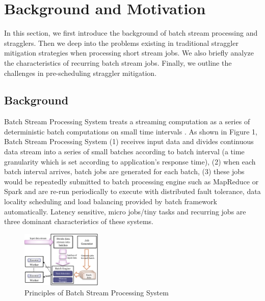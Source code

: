 \section{Background and Motivation}

  In this section, we first introduce the background of batch stream processing and stragglers. Then we deep into the problems existing in traditional straggler mitigation strategies when processing short stream jobs. We also briefly analyze the characteristics of recurring batch stream jobs. Finally, we outline the challenges in pre-scheduling straggler mitigation.

\subsection{Background}

  Batch Stream Processing System treats a streaming computation as a series of deterministic batch computations on small time intervals \cite{Zaharia2013}. As shown in Figure 1, Batch Stream Processing System (1) receives input data and divides continuous data stream into a series of small batches according to batch interval (a time granularity which is set according to application's response time), (2) when each batch interval arrives, batch jobs are generated for each batch, (3) these jobs would be repeatedly submitted to batch processing engine such as MapReduce or Spark and are re-run periodically to execute with distributed fault tolerance, data locality scheduling and load balancing provided by batch framework automatically. Latency sensitive, micro jobs/tiny tasks and recurring jobs are three dominant characteristics of these systems.
  \begin{figure}[htbp]
    \centering
    \includegraphics[width=0.34\textwidth]{FigureBatchStream}
    \caption{Principles of Batch Stream Processing System}\label{Fig. 1:}
  \end{figure}

